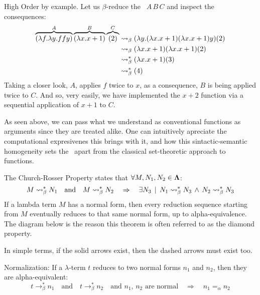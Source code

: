 \documentclass[12pt]{book}
\begin{document}
\begin{example} High Order by example. Let us $\beta$-reduce the \lterm \ $ A \, B \, C $ and inspect the consequences:
  \label{ex:high-order-by-example}
\begin{align*}
  \overbrace { (\lambda f . \lambda y . f f y) }^{A} \overbrace{ (\lambda x . x + 1) }^{B} \overbrace{(2)}^{C}
  &\mathrel{\leadsto}_\beta (\lambda y .(\lambda x . x + 1) (\lambda x . x + 1)y)(2) \\
  &\mathrel{\leadsto}_\beta (\lambda x . x + 1)(\lambda x . x + 1)(2) \\
  &\mathrel{\leadsto}_\beta^* (\lambda x . x + 1) (3) \\
  &\mathrel{\leadsto}_\beta^* (4)
\end{align*}
Taking a closer look, $A$, applies $f$ twice to $x$, as a consequence, $B$ is being applied twice to $C$. And so, very easily, we have implemented the $ x + 2 $ function via a sequential application of $x + 1$ to $C$.
\end{example}
\begin{remark}
  As seen above, we can pass what we understand as conventional functions as arguments since they are treated alike.  One can intuitively apreciate the computational expresivenes this brings with it, and how this sintactic-semantic homogeneity sets the \lcalc \ apart from the classical set-theoretic approach to functions.
\end{remark}

\begin{theorem} The Church-Rosser Property states that $\forall M, N_1, N_2 \in \mathbf{\Lambda}$:
  \[
    M \mathrel{\leadsto}_\beta^* N_1 \quad \text{and} \quad M \mathrel{\leadsto}_\beta^* N_2 \quad \Rightarrow \quad \exists N_3 \, \mid \, N_1 \mathrel{\leadsto}_\beta^* N_3 \,\wedge\, N_2 \mathrel{\leadsto}_\beta^* N_3
  \]
  If a lambda term $M$ has a normal form, then every reduction sequence starting from $M$ eventually reduces to that same normal form, up to alpha-equivalence. The diagram below is the reason this theorem is often referred to as the diamond property.
\begin{center}
\end{center}
\begin{note}
  In simple terms, if the solid arrows exist, then the dashed arrows must exist too.
\end{note}
\end{theorem}
\begin{corollary} Normalization: If a $\lambda$-term $t$ reduces to two normal forms $n_1$ and $n_2$, then they are alpha-equivalent:
\[
t \to_\beta^* n_1 \quad \text{and} \quad t \to_\beta^* n_2 \quad \text{and $n_1$, $n_2$ are normal} \quad \Rightarrow \quad n_1 =_\alpha n_2
\]
\end{corollary}
\end{document}
